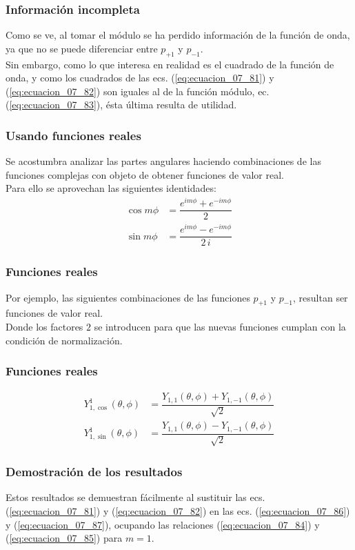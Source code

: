 \documentclass[12pt]{beamer}
\begin{document}
\begin{frame}
\frametitle{Información incompleta}
Como se ve, al tomar el módulo se ha perdido información de la función de onda, ya que no se puede diferenciar entre $p_{+1}$ y $p_{-1}$.
\\
\bigskip
\pause   
Sin embargo, como lo que interesa en realidad es el cuadrado de la función de onda, y como los cuadrados de las ecs. (\ref{eq:ecuacion_07_81}) y (\ref{eq:ecuacion_07_82}) son iguales al de la función módulo, ec. (\ref{eq:ecuacion_07_83}), ésta última resulta de utilidad.
\end{frame}
\begin{frame}
\frametitle{Usando funciones reales}
Se acostumbra analizar las partes angulares haciendo combinaciones de las funciones complejas con objeto de obtener funciones de valor real.
\\
\bigskip
\pause
Para ello se aprovechan las siguientes identidades:
\pause
\begin{align}
\cos m \phi &= \dfrac{e^{i m \phi} + e^{-i m \phi}}{2} \label{eq:ecuacion_07_84} \\[0.5em]
\sin m \phi &= \dfrac{e^{i m \phi} - e^{-i m \phi}}{2 \, i} \label{eq:ecuacion_07_85}
\end{align}
\end{frame}
\begin{frame}
\frametitle{Funciones reales}
Por ejemplo, las siguientes combinaciones de las funciones $p_{+1}$ y $p_{-1}$, resultan ser funciones de valor real.
\\
\bigskip
\pause
Donde los factores $2$ se introducen para que las nuevas funciones cumplan con la condición de normalización.
\end{frame}
\begin{frame}
\frametitle{Funciones reales}
\begin{align}
Y_{1, \cos}^{1} (\theta, \phi) &= \dfrac{Y_{1,1} (\theta, \phi) + Y_{1, -1} (\theta, \phi)}{\sqrt{2}} \label{eq:ecuacion_07_86} \\[0.5em]
Y_{1, \sin}^{1} (\theta, \phi) &= \dfrac{Y_{1,1} (\theta, \phi) - Y_{1, -1} (\theta, \phi)}{\sqrt{2}} \label{eq:ecuacion_07_87}
\end{align}
\end{frame}
\begin{frame}
\frametitle{Demostración de los resultados}
Estos resultados se demuestran fácilmente al sustituir las ecs. (\ref{eq:ecuacion_07_81}) y (\ref{eq:ecuacion_07_82}) en las ecs. (\ref{eq:ecuacion_07_86}) y (\ref{eq:ecuacion_07_87}), ocupando las relaciones (\ref{eq:ecuacion_07_84}) y (\ref{eq:ecuacion_07_85}) para $m = 1$.
\end{frame}
\end{document}
